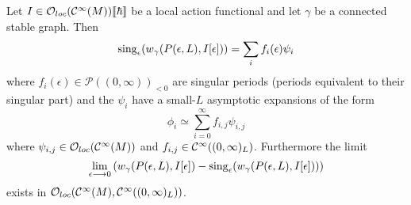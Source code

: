 \begin{theo}
  Let $I \in \mathcal{O}_{loc}(\mathcal{C}^{\infty}(M)) \llbracket \hbar \rrbracket$ be a local action functional and let $\gamma$ be a connected stable graph. Then
  \begin{equation}\sing_\epsilon(w_\gamma(P(\epsilon,L), I[\epsilon])) = \sum_i f_i(\epsilon) \psi_i \end{equation}
  where $f_i(\epsilon) \in \mathcal{P}((0,\infty))_{<0}$ are singular periods (periods equivalent to their singular part) and the $\psi_i$ have a small-$L$ asymptotic expansions of the form
  \begin{equation}\phi_i \simeq \sum_{i = 0}^\infty f_{i,j} \psi_{i,j}\end{equation}
  where $\psi_{i,j} \in \mathcal{O}_{loc}(\mathcal{C}^{\infty}(M))$ and $f_{i,j} \in \mathcal{C}^{\infty}((0,\infty)_L)$. Furthermore the limit
  \begin{equation}\lim_{\epsilon \lra 0} \left( w_\gamma (P(\epsilon,L), I[\epsilon]) - \sing_\epsilon(w_\gamma (P(\epsilon,L), I[\epsilon])) \right)\end{equation}
  exists in $\mathcal{O}_{loc}(\mathcal{C}^{\infty}(M), \mathcal{C}^{\infty}((0,\infty)_L))$.
\end{theo}

